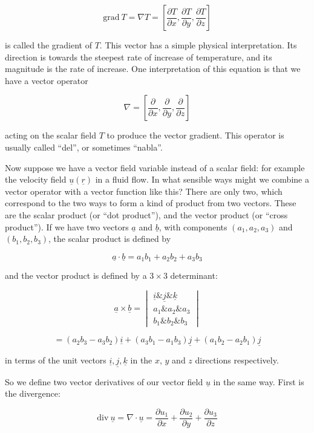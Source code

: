   $$\mathrm{grad~}T = \nabla T = \left[\dfrac{\partial T}{\partial 
  x},\dfrac{\partial T}{\partial y},\dfrac{\partial T}{\partial z}\right] 
  \tag{2}$$ 

  is called the gradient of $T$. This vector has a simple physical 
  interpretation. Its direction is towards the steepest rate of increase of 
  temperature, and its magnitude is the rate of increase. One interpretation of 
  this equation is that we have a vector operator 

  $$\nabla = \left[\dfrac{\partial }{\partial x},\dfrac{\partial }{\partial 
  y},\dfrac{\partial }{\partial z}\right] \tag{3}$$ 

  acting on the scalar field $T$ to produce the vector gradient. This operator 
  is usually called ``del'', or sometimes ``nabla''. 

  Now suppose we have a vector field variable instead of a scalar field: for 
  example the velocity field $\underline{u}(\underline{r})$ in a fluid flow. In 
  what sensible ways might we combine a vector operator with a vector function 
  like this? There are only two, which correspond to the two ways to form a 
  kind of product from two vectors. These are the scalar product (or ``dot 
  product''), and the vector product (or ``cross product''). If we have two 
  vectors $\underline{a}$ and $\underline{b}$, with components $(a_1,a_2,a_3)$ 
  and $(b_1,b_2,b_3)$, the scalar product is defined by 

  $$\underline{a}\cdot \underline{b} = a_1b_1+a_2b_2+a_3b_3 \tag{4}$$ 

  and the vector product is defined by a $3 \times 3$ determinant: 

  $$\underline{a} \times \underline{b} = \begin{vmatrix} 
  \underline{i}\&\underline{j}\&\underline{k}\\a_1\&a_2\&a_3\\b_1\&b_2\&b_3 
  \end{vmatrix}$$ 

  
  $$=(a_2b_3-a_3b_2)\underline{i}+(a_3b_1-a_1b_3)\underline{j}+(a_1b_2-a_2b_1)\underline{j} 
  \tag{5}$$ 

  in terms of the unit vectors $\underline{i},\underline{j},\underline{k}$ in 
  the $x$, $y$ and $z$ directions respectively. 

  So we define two vector derivatives of our vector field $\underline{u}$ in 
  the same way. First is the divergence: 

  $$\mathrm{div~} \underline{u} = \nabla \cdot \underline{u} = \dfrac{\partial 
  u_1}{\partial x}+\dfrac{\partial u_2}{\partial y}+\dfrac{\partial 
  u_3}{\partial z} \tag{6}$$ 

